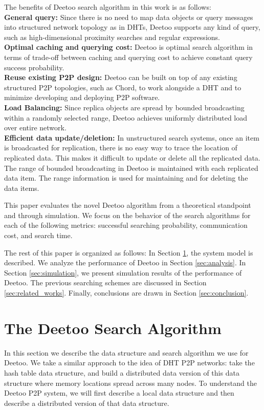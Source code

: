 \documentclass[conference]{IEEEtran}
\begin{document}
The benefits of Deetoo search algorithm in this work is as follows:\\ 
{\bf General query:} Since there is no need to map data objects or query 
messages into structured network topology as in DHTs, Deetoo supports
any kind of query, such as high-dimensional proximity searches and regular 
expressions.\\
{\bf Optimal caching and querying cost:} Deetoo is optimal search algorithm
in terms of trade-off between caching and querying cost to achieve 
constant query success probability.\\
{\bf Reuse existing P2P design:}
Deetoo can be built on top of any existing structured P2P topologies, such as
Chord, to work alongside a DHT and to minimize developing and deploying P2P 
software.\\
{\bf Load Balancing:} 
Since replica objects are spread by bounded broadcasting within 
a randomly selected range, Deetoo achieves uniformly distributed 
load over entire network. \\
{\bf Efficient data update/deletion:} In unstructured search systems, 
once an item is broadcasted for replication, 
there is no easy way to trace the location of replicated data. 
This makes it difficult to update or delete all the replicated data.
The range of bounded broadcasting in Deetoo is maintained with 
each replicated data item.  
The range information is used for maintaining
and for deleting the data items.

This paper evaluates the novel Deetoo algorithm from a theoretical 
standpoint and through simulation. 
We focus on the behavior of the search algorithms for each of the
following metrics: successful searching probability,
communication cost, and search time. 

The rest of this paper is organized as follows: 
In Section \ref{sec:model}, the system model
is described. We analyze the performance of Deetoo in
Section \ref{sec:analysis}. In Section \ref{sec:simulation}, we present
simulation results of the performance of Deetoo. 
The previous searching 
schemes are discussed in Section \ref{sec:related_works}. 
Finally, conclusions are drawn in Section \ref{sec:conclusion}.

\section{The Deetoo Search Algorithm}\label{sec:model}
In this section we describe the data structure and search algorithm
we use for Deetoo.  We take a similar approach to the idea of DHT P2P networks: take the hash table
data structure, and build a distributed data version of this data structure
where memory locations spread across many nodes.  
To understand the Deetoo P2P system, we will first describe a local
data structure and then describe a distributed version of that data structure.
\end{document}
